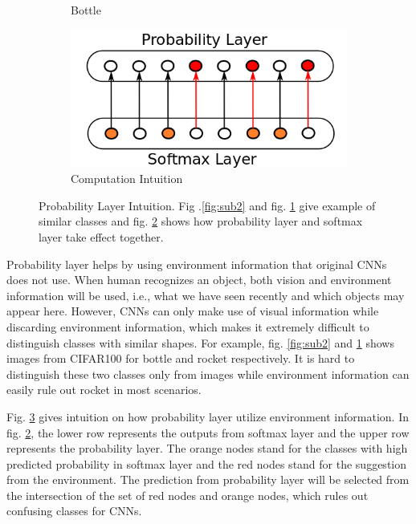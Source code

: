 \documentclass{article}
\begin{document}
\begin{figure}[t]
\begin{subfigure}{.23\textwidth}
  \caption{Bottle}
  \label{fig:sub3}
\end{subfigure}
\begin{subfigure}{.45\textwidth}
  \centering
  \includegraphics[width=\textwidth]{intuition.png}
  \caption{Computation Intuition}
  \label{fig:sub1}
\end{subfigure}
\caption{Probability Layer Intuition. Fig .\ref{fig:sub2} and fig. \ref{fig:sub3} give example of similar classes and fig. \ref{fig:sub1} shows how probability layer and softmax layer take effect together.}
\label{fig:intuition}
\end{figure}



Probability layer helps by using environment information that original CNNs does not use. When human recognizes an object, both vision and environment information will be used, i.e., what we have seen recently and which objects may appear here. However, CNNs can only make use of visual information while discarding environment information, which makes it extremely difficult to distinguish classes with similar shapes. For example, fig. \ref{fig:sub2} and \ref{fig:sub3} shows images from CIFAR100 for bottle and rocket respectively. It is hard to distinguish these two classes only from images while environment information can easily rule out rocket in most scenarios. 

Fig. \ref{fig:intuition} gives intuition on how probability layer utilize environment information. In fig. \ref{fig:sub1}, the lower row represents the outputs from softmax layer and the upper row represents the probability layer. The orange nodes stand for the classes with high predicted probability in softmax layer and the red nodes stand for the suggestion from the environment. The prediction from probability layer will be selected from the intersection of the set of red nodes and orange nodes, which rules out confusing classes for CNNs. 
\end{document}
